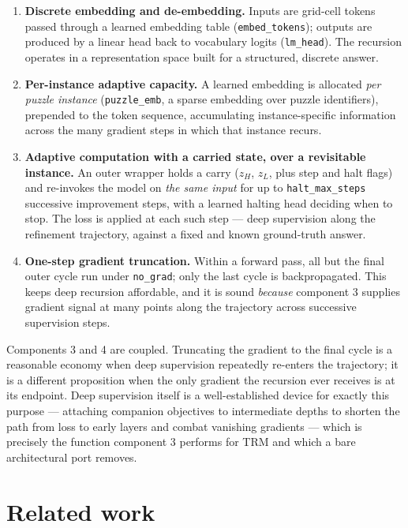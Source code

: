 \documentclass[11pt]{article}
\begin{document}
\begin{enumerate}
  \item \textbf{Discrete embedding and de-embedding.} Inputs are grid-cell tokens passed through a learned embedding table (\texttt{embed\_tokens}); outputs are produced by a linear head back to vocabulary logits (\texttt{lm\_head}). The recursion operates in a representation space built for a structured, discrete answer.
  \item \textbf{Per-instance adaptive capacity.} A learned embedding is allocated \emph{per puzzle instance} (\texttt{puzzle\_emb}, a sparse embedding over puzzle identifiers), prepended to the token sequence, accumulating instance-specific information across the many gradient steps in which that instance recurs.
  \item \textbf{Adaptive computation with a carried state, over a revisitable instance.} An outer wrapper holds a carry ($z_H$, $z_L$, plus step and halt flags) and re-invokes the model on \emph{the same input} for up to \texttt{halt\_max\_steps} successive improvement steps, with a learned halting head deciding when to stop. The loss is applied at each such step --- deep supervision along the refinement trajectory, against a fixed and known ground-truth answer.
  \item \textbf{One-step gradient truncation.} Within a forward pass, all but the final outer cycle run under \texttt{no\_grad}; only the last cycle is backpropagated. This keeps deep recursion affordable, and it is sound \emph{because} component 3 supplies gradient signal at many points along the trajectory across successive supervision steps.
\end{enumerate}

Components 3 and 4 are coupled. Truncating the gradient to the final cycle is a reasonable economy when deep supervision repeatedly re-enters the trajectory; it is a different proposition when the only gradient the recursion ever receives is at its endpoint. Deep supervision itself is a well-established device for exactly this purpose --- attaching companion objectives to intermediate depths to shorten the path from loss to early layers and combat vanishing gradients \citep{lee2015dsn} --- which is precisely the function component 3 performs for TRM and which a bare architectural port removes.

\section{Related work}
\end{document}
